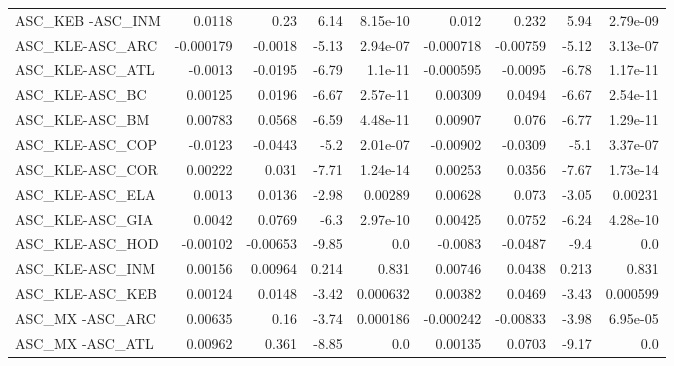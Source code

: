 \begin{tabular}{lrrrrrrrr}
ASC\_KEB -ASC\_INM                        &      0.0118 &         0.23 &    6.14 & 8.15e-10 &      0.012 &       0.232 &         5.94 &      2.79e-09 \\
ASC\_KLE-ASC\_ARC                         &   -0.000179 &      -0.0018 &   -5.13 & 2.94e-07 &  -0.000718 &    -0.00759 &        -5.12 &      3.13e-07 \\
ASC\_KLE-ASC\_ATL                         &     -0.0013 &      -0.0195 &   -6.79 &  1.1e-11 &  -0.000595 &     -0.0095 &        -6.78 &      1.17e-11 \\
ASC\_KLE-ASC\_BC                          &     0.00125 &       0.0196 &   -6.67 & 2.57e-11 &    0.00309 &      0.0494 &        -6.67 &      2.54e-11 \\
ASC\_KLE-ASC\_BM                          &     0.00783 &       0.0568 &   -6.59 & 4.48e-11 &    0.00907 &       0.076 &        -6.77 &      1.29e-11 \\
ASC\_KLE-ASC\_COP                         &     -0.0123 &      -0.0443 &    -5.2 & 2.01e-07 &   -0.00902 &     -0.0309 &         -5.1 &      3.37e-07 \\
ASC\_KLE-ASC\_COR                         &     0.00222 &        0.031 &   -7.71 & 1.24e-14 &    0.00253 &      0.0356 &        -7.67 &      1.73e-14 \\
ASC\_KLE-ASC\_ELA                         &      0.0013 &       0.0136 &   -2.98 &  0.00289 &    0.00628 &       0.073 &        -3.05 &       0.00231 \\
ASC\_KLE-ASC\_GIA                         &      0.0042 &       0.0769 &    -6.3 & 2.97e-10 &    0.00425 &      0.0752 &        -6.24 &      4.28e-10 \\
ASC\_KLE-ASC\_HOD                         &    -0.00102 &     -0.00653 &   -9.85 &      0.0 &    -0.0083 &     -0.0487 &         -9.4 &           0.0 \\
ASC\_KLE-ASC\_INM                         &     0.00156 &      0.00964 &   0.214 &    0.831 &    0.00746 &      0.0438 &        0.213 &         0.831 \\
ASC\_KLE-ASC\_KEB                         &     0.00124 &       0.0148 &   -3.42 & 0.000632 &    0.00382 &      0.0469 &        -3.43 &      0.000599 \\
ASC\_MX -ASC\_ARC                         &     0.00635 &         0.16 &   -3.74 & 0.000186 &  -0.000242 &    -0.00833 &        -3.98 &      6.95e-05 \\
ASC\_MX -ASC\_ATL                         &     0.00962 &        0.361 &   -8.85 &      0.0 &    0.00135 &      0.0703 &        -9.17 &           0.0 \\

\end{tabular}
